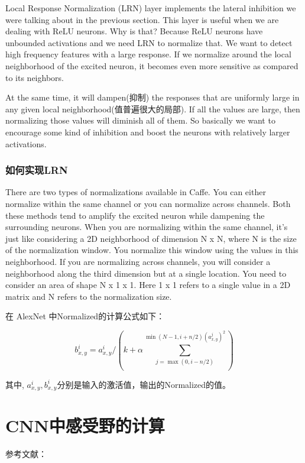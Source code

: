 Local Response Normalization (LRN) layer implements the lateral inhibition we were talking about in the previous section. This layer is useful when we are dealing with ReLU neurons. Why is that? Because ReLU neurons have unbounded activations and we need LRN to normalize that. We want to detect high frequency features with a large response. If we normalize around the local neighborhood of the excited neuron, it becomes even more sensitive as compared to its neighbors.

At the same time, it will dampen(抑制) the responses that are uniformly large in any given local neighborhood(值普遍很大的局部). If all the values are large, then normalizing those values will diminish all of them. So basically we want to encourage some kind of inhibition and boost the neurons with relatively larger activations. 

\subsubsection{如何实现LRN}

There are two types of normalizations available in Caffe. You can either normalize within the same channel or you can normalize across channels. Both these methods tend to amplify the excited neuron while dampening the surrounding neurons. When you are normalizing within the same channel, it’s just like considering a 2D neighborhood of dimension N x N, where N is the size of the normalization window. You normalize this window using the values in this neighborhood. If you are normalizing across channels, you will consider a neighborhood along the third dimension but at a single location. You need to consider an area of shape N x 1 x 1. Here 1 x 1 refers to a single value in a 2D matrix and N refers to the normalization size.

在 AlexNet 中Normalized的计算公式如下：

\begin{displaymath}
b_{x, y}^i = a_{x, y}^i / \left( k + \alpha \sum_{j = \max(0, i - n/2)}^{\min(N-1, i + n/2)(a_{x, y}^j)^2} \right)
\end{displaymath}

其中, $a_{x, y}^i, b_{x, y}^i$分别是输入的激活值，输出的Normalized的值。

\section{CNN中感受野的计算}

参考文献：

